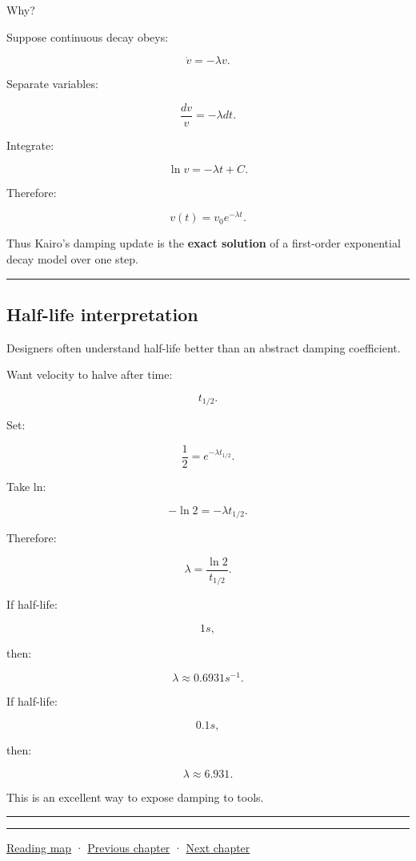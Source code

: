 Why?

Suppose continuous decay obeys:

\[
\dot v=-\lambda v.
\]

Separate variables:

\[
\frac{dv}{v}
=
-\lambda dt.
\]

Integrate:

\[
\ln v
=
-\lambda t+C.
\]

Therefore:

\[
v(t)=v_0e^{-\lambda t}.
\]

Thus Kairo's damping update is the \textbf{exact solution} of a first-order exponential decay model over one step.

\begin{center}\rule{0.5\linewidth}{0.5pt}\end{center}

\subsection{Half-life interpretation}\label{06-engine-ii-ch038-half-life-interpretation}

Designers often understand half-life better than an abstract damping coefficient.

Want velocity to halve after time:

\[
t_{1/2}.
\]

Set:

\[
\frac12
=
e^{-\lambda t_{1/2}}.
\]

Take ln:

\[
-\ln2
=
-\lambda t_{1/2}.
\]

Therefore:

\[
\boxed{
\lambda
=
\frac{\ln2}{t_{1/2}}.
}
\]

If half-life:

\[
1s,
\]

then:

\[
\lambda\approx0.6931s^{-1}.
\]

If half-life:

\[
0.1s,
\]

then:

\[
\lambda\approx6.931.
\]

This is an excellent way to expose damping to tools.

\begin{center}\rule{0.5\linewidth}{0.5pt}\end{center}

\begin{center}\rule{0.5\linewidth}{0.5pt}\end{center}

\hyperref[volume-reading-map]{Reading map} · \hyperref[06-engine-ii-ch037]{Previous chapter} · \hyperref[06-engine-ii-ch039]{Next chapter}
